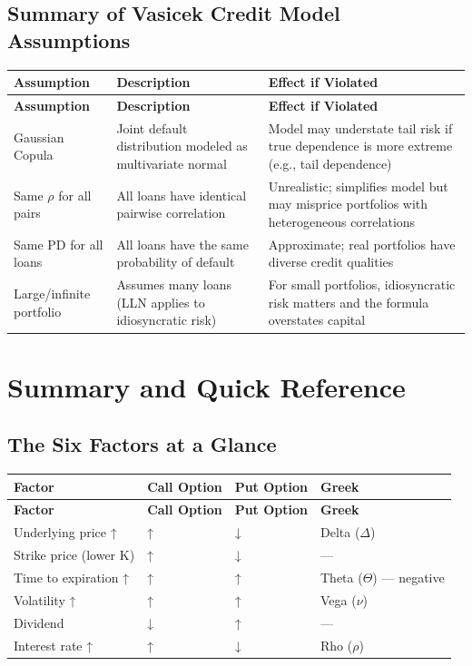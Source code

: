 \documentclass[12pt,openany]{book}
\theoremstyle{definition}
\theoremstyle{remark}
\begin{document}
\subsection{Summary of Vasicek Credit Model Assumptions}
\begingroup
\footnotesize
\begin{longtable}{@{}L{0.19\textwidth}L{0.36\textwidth}L{0.36\textwidth}@{}}
\toprule
\textbf{Assumption} & \textbf{Description} & \textbf{Effect if Violated} \\
\midrule
\endfirsthead
\toprule
\textbf{Assumption} & \textbf{Description} & \textbf{Effect if Violated} \\
\midrule
\endhead
Gaussian Copula & Joint default distribution modeled as multivariate normal & Model may understate tail risk if true dependence is more extreme (e.g., tail dependence) \\
Same \(\rho\) for all pairs & All loans have identical pairwise correlation & Unrealistic; simplifies model but may misprice portfolios with heterogeneous correlations \\
Same PD for all loans & All loans have the same probability of default & Approximate; real portfolios have diverse credit qualities \\
Large/infinite portfolio & Assumes many loans (LLN applies to idiosyncratic risk) & For small portfolios, idiosyncratic risk matters and the formula overstates capital \\
\bottomrule
\end{longtable}
\endgroup
\medskip
\section{Summary and Quick Reference}
\subsection{The Six Factors at a Glance}
\begingroup
\footnotesize
\begin{longtable}{@{}L{0.15\textwidth}L{0.25\textwidth}L{0.25\textwidth}L{0.25\textwidth}@{}}
\toprule
\textbf{Factor} & \textbf{Call Option} & \textbf{Put Option} & \textbf{Greek} \\
\midrule
\endfirsthead
\toprule
\textbf{Factor} & \textbf{Call Option} & \textbf{Put Option} & \textbf{Greek} \\
\midrule
\endhead
Underlying price ↑ & ↑ & ↓ & Delta (\(\Delta\)) \\
Strike price (lower K) & ↑ & ↓ & --- \\
Time to expiration ↑ & ↑ & ↑ & Theta (\(\Theta\)) --- negative \\
Volatility ↑ & ↑ & ↑ & Vega (\(\nu\)) \\
Dividend & ↓ & ↑ & --- \\
Interest rate ↑ & ↑ & ↓ & Rho (\(\rho\)) \\
\bottomrule
\end{longtable}
\endgroup
\end{document}
